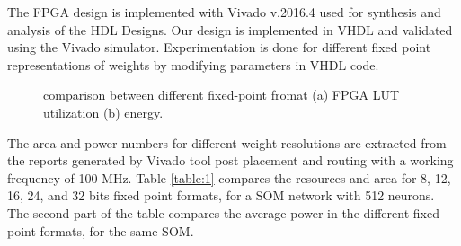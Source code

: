 \documentclass[a4paper,10pt]{article}
\begin{document}
The FPGA design is implemented with Vivado v.2016.4 used for synthesis and analysis of the HDL Designs. Our design is implemented in VHDL and validated using the Vivado simulator. Experimentation is done for different fixed point representations of weights by modifying parameters in VHDL code. 

\begin{figure}[htb]
	\centering
	\hfil
	\caption{comparison between different fixed-point fromat (a) FPGA LUT utilization (b) energy.}
	\label{fig:metrics}
\end{figure}

The area and power numbers for different weight resolutions are extracted from the reports generated by Vivado tool post placement and routing with a working frequency of 100 MHz. Table \ref{table:1} compares the resources and area for 8, 12, 16, 24, and 32 bits fixed point formats, for a SOM network with 512 neurons. The second part of the table compares the average power in the different fixed point formats, for the same SOM.
\end{document}
